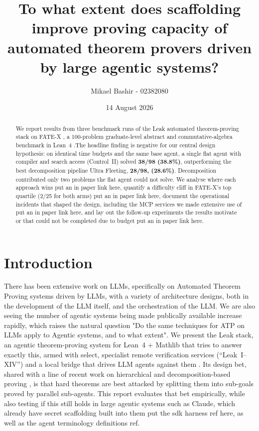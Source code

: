 \documentclass[12pt, a4paper]{article}
\title{\textbf{To what extent does scaffolding improve proving capacity of automated theorem
provers driven by large agentic systems?}}
\author{Mikael Bashir - 02382080}
\date{14 August 2026}
\begin{document}
\maketitle

\begin{abstract}
\noindent
We report results from three benchmark runs of the Leak \cite{leakabout} automated
theorem-proving stack on FATE-X \cite{fatex2025}, a 100-problem graduate-level
abstract and commutative-algebra benchmark in Lean~4 \cite{demoura2021lean4}.The headline 
finding is negative for our central design hypothesis: on identical time budgets and the same base agent, a single
flat agent with compiler and search access (Control~II) solved
\textbf{38/98 (38.8\%)}, outperforming the best decomposition pipeline
Ultra Fleeting, \textbf{28/98, (28.6\%)}. Decomposition contributed only two problems
the flat agent could not solve. We analyse where each approach wins {put an in paper link here}, quantify a
difficulty cliff in FATE-X's top quartile (2/25 for both arms) {put an in paper link here}, document the
operational incidents that shaped the design, including the MCP services we made 
extensive use of {put an in paper link here}, and lay out the follow-up experiments the results motivate or 
that could not be completed due to budget {put an in paper link here}.
\end{abstract}

\tableofcontents
\newpage

\section{Introduction}

There has been extensive work on LLMs, specifically on Automated Theorem Proving systems 
driven by LLMs, with a variety of architecture designs, both in the development of the LLM itself,
and the orchestration of the LLM. We are also seeing the number of agentic systems being made publically available
increase rapidly, which raises the natural question "Do the same techniques for ATP on LLMs apply to Agentic systems, and to what extent". 
We present the Leak stack, an agentic theorem-proving system for Lean~4 + Mathlib
\cite{demoura2021lean4,mathlib2020} that tries to answer exactly this, armed with select, specialist remote verification services
(``Leak~I--XIV'') and a local bridge that drives LLM agents against them
\cite{competemath,hfspaces}. Its design bet, shared with a line of recent work
on hierarchical and decomposition-based proving
\cite{lample2022hypertree,deepseekproverv2,decomposition_openreview,davis2025goedelspoetry},
is that hard theorems are best attacked by splitting them into sub-goals proved
by parallel sub-agents. This report evaluates that bet empirically, while also 
testing if this still holds in large agentic systems such as Claude, which already have secret
scaffolding built into them {put the sdk harness ref here, as well as the agent terminology definitions ref}.
\end{document}
